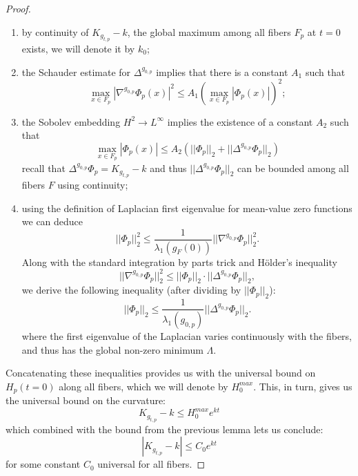 \documentclass[10pt,a4paper]{amsart}
\begin{document}
\begin{proof}
    \begin{enumerate}
        \item by continuity of $K_{g_{t,p}}-k$, the global maximum among all fibers $F_p$ at $t=0$ exists, we will denote it by $k_0$;
        \item the Schauder estimate for $\Delta^{g_{0,p}}$ implies that there is a constant $A_1$ such that 
        $$\underset{x\in F_p}{\max} |\nabla^{g_{0,p}} \Phi_p(x)|^2 \leq A_1 (\underset{x\in F_p}{\max}|\Phi_p(x)|)^2; $$
        \item the Sobolev embedding $H^2 \to L^\infty$ implies the existence of a constant $A_2$ such that
        $$\underset{x\in F_p}{\max} |\Phi_p(x)| \leq A_2 (||\Phi_p||_2 + ||\Delta^{g_{0,p}}\Phi_p||_2)$$
        recall that $\Delta^{g_{0,p}}\Phi_p = K_{g_{t,p}}-k$ and thus $||\Delta^{g_{0,p}}\Phi_p||_2$ can be bounded among all fibers $F$ using continuity;
        \item using the definition of Laplacian first eigenvalue for mean-value zero functions we can deduce 
        $$||\Phi_p||^2_2 \leq \frac{1}{\lambda_1(g_F(0))} ||\nabla^{g_{0,p}} \Phi_p||_2^2.$$
        Along with the standard integration by parts trick and  H\"older's inequality
        $$||\nabla^{g_{0,p}} \Phi_p||_2^2 \leq ||\Phi_p||_2 \cdot ||\Delta^{g_{0,p}} \Phi_p||_2,  $$
        we derive the following inequality (after dividing by $|| \Phi_p||_2$)\thinspace: 
        $$||\Phi_p||_2 \leq \frac{1}{\lambda_1(g_{0,p})} ||\Delta^{g_{0,p}} \Phi_p||_2.$$
        where the first eigenvalue of the Laplacian varies continuously with the fibers, and thus has the global non-zero minimum $\Lambda$.
    \end{enumerate}
    Concatenating these inequalities provides us with the universal bound on $H_p(t=0)$ along all fibers, which we will denote by $H_0^{max}$. This, in turn, gives us the universal bound on the curvature\thinspace: 
    $$K_{g_{t,p}}-k \leq H^{max}_0 e^{kt}$$
    which combined with the bound from the previous lemma lets us conclude\thinspace: 
    $$|K_{g_{t,p}}-k| \leq C_0 e^{kt}$$
    for some constant $C_0$ universal for all fibers. 
\end{proof}
\end{document}

